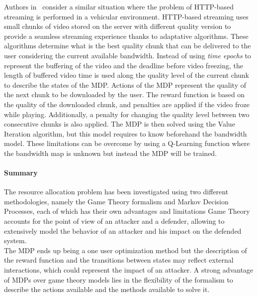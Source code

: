 Authors in~\cite{Bokani2015} consider a similar situation where the problem of HTTP-based streaming is performed in a vehicular environment.
HTTP-based streaming uses small chunks of video stored on the server with different quality version to provide a seamless streaming experience thanks to adaptative algorithms. 
These algorithms determine what is the best quality chunk that can be delivered to the user considering the current available bandwidth. Instead of using \textit{time epochs} to represent the buffering of the video and the deadline before video freezing, the length of buffered video time is used along the quality level of the current chunk to describe the states of the MDP. 
Actions of the MDP represent the quality of the next chunk to be downloaded by the user.
The reward function is based on the quality of the downloaded chunk, and penalties are applied if the video froze while playing. Additionally, a penalty for changing the quality level between two consecutive chunks is also applied.
The MDP is then solved using the Value Iteration algorithm, but this model requires to know beforehand the bandwidth model. 
These limitations can be overcome by using a Q-Learning function where the bandwidth map is unknown but instead the MDP will be trained.

\paragraph{Summary}
The resource allocation problem has been investigated using two different methodologies, namely the Game Theory formalism and Markov Decision Processes, each of which has their own advantages and limitations
Game Theory accounts for the point of view of an attacker and a defender, allowing to extensively model the behavior of an attacker and his impact on the defended system.\\
The MDP ends up being a one user optimization method but the description of the reward function and the transitions between states may reflect external interactions, which could represent the impact of an attacker.
A strong advantage of MDPs over game theory models lies in the flexibility of the formalism to describe the actions available and the methods available to solve it.


